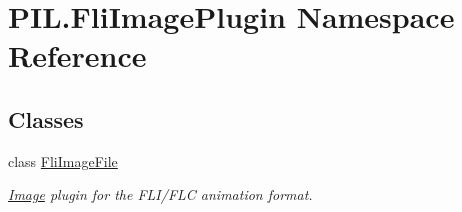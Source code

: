 \hypertarget{namespacePIL_1_1FliImagePlugin}{}\section{P\+I\+L.\+Fli\+Image\+Plugin Namespace Reference}
\label{namespacePIL_1_1FliImagePlugin}
\subsection*{Classes}
\begin{DoxyCompactItemize}
\item 
class \hyperlink{classPIL_1_1FliImagePlugin_1_1FliImageFile}{Fli\+Image\+File}
\begin{DoxyCompactList}\small\item\em \hyperlink{namespacePIL_1_1Image}{Image} plugin for the F\+L\+I/\+F\+LC animation format. \end{DoxyCompactList}\end{DoxyCompactItemize}
